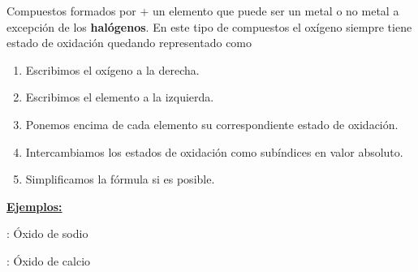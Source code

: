 \documentclass[12pt]{article}
\begin{document}
Compuestos formados por  + un elemento que puede ser un metal o no metal a excepción de los \textbf{halógenos}.
En este tipo de compuestos el oxígeno siempre tiene estado de oxidación  quedando representado como  

\vspace*{8pt}

\begin{enumerate}[label=\itembolascolor{\arabic*}{green!50!black}]
    \item Escribimos el oxígeno a la derecha.
    \item Escribimos el elemento a la izquierda.
    \item Ponemos encima de cada elemento su correspondiente estado de oxidación.
    \item Intercambiamos los estados de oxidación como subíndices en valor absoluto.
    \item Simplificamos la fórmula si es posible.
\end{enumerate}

\textbf{\uline{Ejemplos:}}

 : Óxido de sodio \ch{->}   \ch{->} 

 : Óxido de calcio \ch{->}   \ch{->}  \ch{->} 

\vspace*{2mm}
\end{document}
